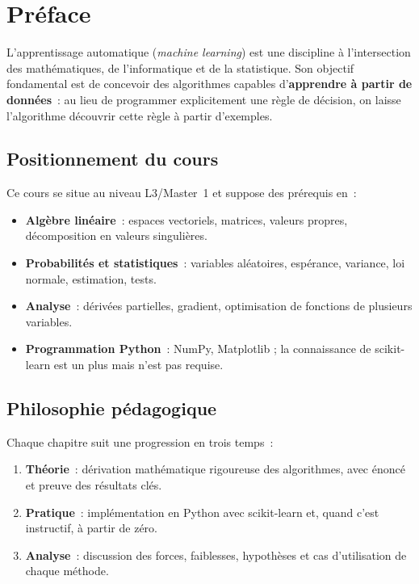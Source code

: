 \chapter*{Pr\'eface}

L'apprentissage automatique (\emph{machine learning}) est une discipline
\`a l'intersection des math\'ematiques, de l'informatique et de la
statistique. Son objectif fondamental est de concevoir des algorithmes
capables d'\textbf{apprendre \`a partir de donn\'ees}~: au lieu de
programmer explicitement une r\`egle de d\'ecision, on laisse l'algorithme
d\'ecouvrir cette r\`egle \`a partir d'exemples.

\section*{Positionnement du cours}

Ce cours se situe au niveau L3/Master~1 et suppose des pr\'erequis en~:
\begin{itemize}
  \item \textbf{Alg\`ebre lin\'eaire}~: espaces vectoriels, matrices,
    valeurs propres, d\'ecomposition en valeurs singuli\`eres.
  \item \textbf{Probabilit\'es et statistiques}~: variables al\'eatoires,
    esp\'erance, variance, loi normale, estimation, tests.
  \item \textbf{Analyse}~: d\'eriv\'ees partielles, gradient, optimisation
    de fonctions de plusieurs variables.
  \item \textbf{Programmation Python}~: NumPy, Matplotlib ; la connaissance
    de scikit-learn est un plus mais n'est pas requise.
\end{itemize}

\section*{Philosophie p\'edagogique}

Chaque chapitre suit une progression en trois temps~:
\begin{enumerate}
  \item \textbf{Th\'eorie}~: d\'erivation math\'ematique rigoureuse des
    algorithmes, avec \'enonc\'e et preuve des r\'esultats cl\'es.
  \item \textbf{Pratique}~: impl\'ementation en Python avec scikit-learn
    et, quand c'est instructif, \`a partir de z\'ero.
  \item \textbf{Analyse}~: discussion des forces, faiblesses, hypoth\`eses
    et cas d'utilisation de chaque m\'ethode.
\end{enumerate}

